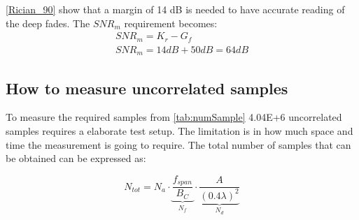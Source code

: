 \autoref{Rician_90} show that a margin of 14 dB is needed to have accurate reading of the deep fades. The $SNR_m$ requirement becomes:
\begin{align}\label{needed_SNR}
SNR_m = K_r - G_f \\
SNR_m = 14dB + 50dB = 64dB 
\end{align}
\begin{where}
\end{where}

\newpage
\subsection{How to measure uncorrelated samples}
\label{howtomeasureUS}
To measure the required samples from \autoref{tab:numSample} 4.04E+6 uncorrelated samples requires a elaborate test setup. The limitation is in how much space and time the measurement is going to require. The total number of samples that can be obtained can be expressed as: 


\begin{equation}
N_{tot} = N_a \cdot \underbrace{\frac{f_{span}}{B_C }}_{N_f} \cdot \underbrace{\frac{A}{(0.4\lambda)^2}}_{N_d}
\label{howtosample}
\end{equation} 
 
\begin{where}
\end{where} 
 
